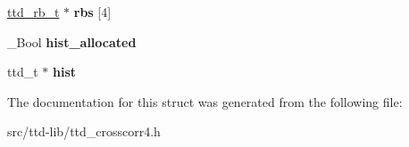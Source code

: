 \begin{DoxyCompactItemize}
\item 
\hypertarget{structttd__ccorr4__t_a77f86ee3b0e8748c96055ea29761dac6}{}\hyperlink{structttd__rb__t}{ttd\+\_\+rb\+\_\+t} $\ast$ {\bfseries rbs} \mbox{[}4\mbox{]}\label{structttd__ccorr4__t_a77f86ee3b0e8748c96055ea29761dac6}

\item 
\hypertarget{structttd__ccorr4__t_a61dab9bc50613befc4439f619aad3e13}{}\+\_\+\+Bool {\bfseries hist\+\_\+allocated}\label{structttd__ccorr4__t_a61dab9bc50613befc4439f619aad3e13}

\item 
\hypertarget{structttd__ccorr4__t_a08d0cbe36a8a9b11a64d2ced07040949}{}ttd\+\_\+t $\ast$ {\bfseries hist}\label{structttd__ccorr4__t_a08d0cbe36a8a9b11a64d2ced07040949}

\end{DoxyCompactItemize}


The documentation for this struct was generated from the following file\+:\begin{DoxyCompactItemize}
\item 
src/ttd-\/lib/ttd\+\_\+crosscorr4.\+h\end{DoxyCompactItemize}
